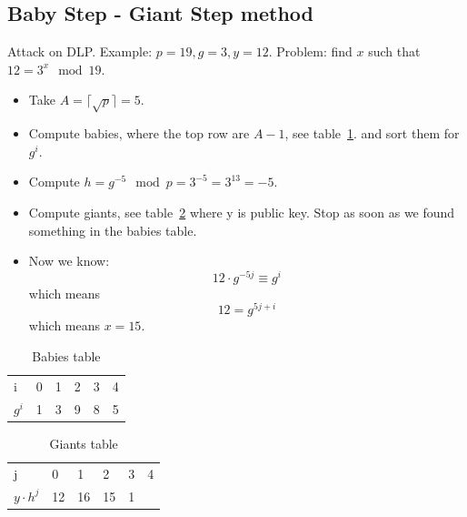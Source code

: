 \documentclass[language=english,number=]{homework}
\begin{document}
    \subsection{Baby Step - Giant Step method}

    Attack on DLP.
    Example: $p=19, g=3, y=12$. Problem: find $x$ such that $12 = 3^x \mod 19$.

    \begin{itemize}
        \item Take $A = \lceil \sqrt p \rceil = 5$.
        \item Compute babies, where the top row are $A-1$, see table~\ref{tbl:babies}.
        and sort them for $g^i$.
        \item Compute $h = g^{-5} \mod p = 3^{-5} = 3^{13} = -5$.
        \item Compute giants, see table~\ref{tbl:giants} where y is public key.
        Stop as soon as we found something in the babies table.
        \item Now we know:
        \[
            12 \cdot g^{-5 j} \equiv g^{i}
        \]
        which means
        \[
            12 = g^{5j+i}
        \]
        which means $x=15$.
    \end{itemize}

\begin{table}[h]
    \centering
    \begin{tabular}{l|l l l l l}
        i & 0 & 1 & 2 & 3 & 4 \\
        $g^i$ & 1 & 3 & 9 & 8 & 5
    \end{tabular}
    \caption{Babies table}
    \label{tbl:babies}
\end{table}

\begin{table}[h]
    \centering
    \begin{tabular}{l|l l l l l}
        j & 0 & 1 & 2 & 3 & 4 \\
        $y \cdot h^j$ & 12 & 16 & 15 & 1 &
    \end{tabular}
    \caption{Giants table}
    \label{tbl:giants}
\end{table}
\end{document}
